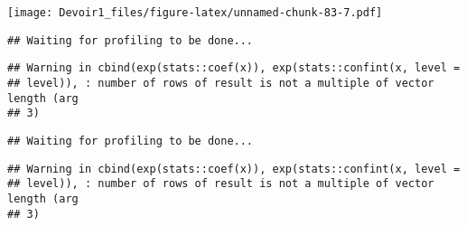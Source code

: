 \documentclass[]{article}
\newenvironment{Shaded}{\begin{snugshade}}{\end{snugshade}}
\newcommand{\KeywordTok}[1]{\textcolor[rgb]{0.13,0.29,0.53}{\textbf{#1}}}
\newcommand{\DataTypeTok}[1]{\textcolor[rgb]{0.13,0.29,0.53}{#1}}
\newcommand{\DecValTok}[1]{\textcolor[rgb]{0.00,0.00,0.81}{#1}}
\newcommand{\StringTok}[1]{\textcolor[rgb]{0.31,0.60,0.02}{#1}}
\newcommand{\OperatorTok}[1]{\textcolor[rgb]{0.81,0.36,0.00}{\textbf{#1}}}
\newcommand{\NormalTok}[1]{#1}
\begin{document}
\texttt{[image: Devoir1\_files/figure-latex/unnamed-chunk-83-7.pdf]}

\begin{Shaded}
\end{Shaded}

\begin{verbatim}
## Waiting for profiling to be done...
\end{verbatim}

\begin{verbatim}
## Warning in cbind(exp(stats::coef(x)), exp(stats::confint(x, level =
## level)), : number of rows of result is not a multiple of vector length (arg
## 3)
\end{verbatim}

\begin{verbatim}
## Waiting for profiling to be done...
\end{verbatim}

\begin{verbatim}
## Warning in cbind(exp(stats::coef(x)), exp(stats::confint(x, level =
## level)), : number of rows of result is not a multiple of vector length (arg
## 3)
\end{verbatim}
\end{document}
